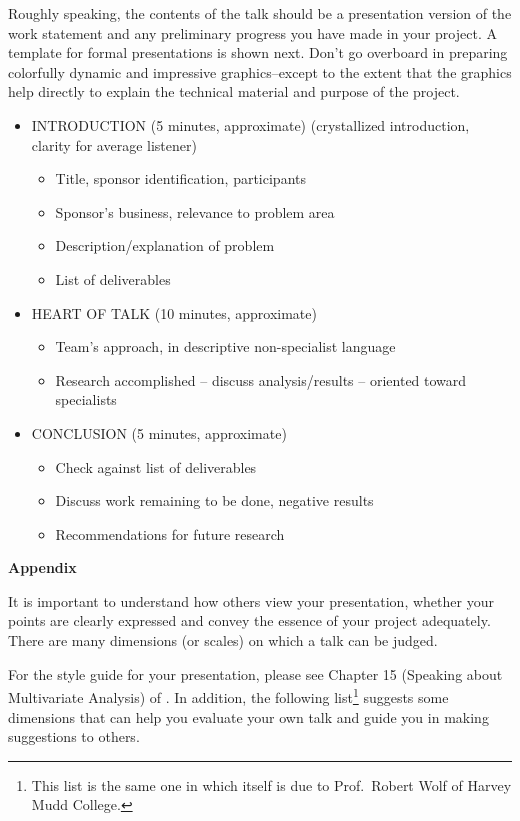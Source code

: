 \documentclass[12pt]{article}
\begin{document}
Roughly speaking, the contents of the talk should be a presentation
version of the work statement and any preliminary 
progress you have made in your project. A template for formal
presentations is shown next. Don't go overboard
in preparing colorfully dynamic and impressive graphics--except to the
extent that the graphics help directly to explain the technical
material and purpose of the project. 
\begin{itemize}
\item INTRODUCTION (5 minutes, approximate) (crystallized
  introduction, clarity for average listener)
\begin{itemize}
\item Title, sponsor identification, participants
\item Sponsor's business, relevance to problem area
\item Description/explanation of problem
\item List of deliverables
\end{itemize}
\item HEART OF TALK (10 minutes, approximate)
\begin{itemize}
\item Team's approach, in descriptive non-specialist language
\item Research accomplished -- discuss analysis/results -- oriented toward
specialists
\end{itemize}
\item CONCLUSION (5 minutes, approximate)
\begin{itemize}
\item Check against list of deliverables
\item Discuss work remaining to be done, negative results
\item Recommendations for future research
\end{itemize}
\end{itemize}



\begin{center}
{\bf Appendix}
\end{center}

It is important to understand how others view your presentation,
whether your points are clearly expressed and convey the essence of
your project adequately. There are many dimensions (or scales) on
which a talk can be judged. 

For the style guide for your presentation, please see 
Chapter 15 (Speaking about Multivariate Analysis) of \cite{WMA2005}.
In addition, the following list\footnote{This list
  is the same one in \cite{WMA2005} which itself is due to Prof.\  Robert Wolf of Harvey Mudd College.} suggests some dimensions that
can help you evaluate your own talk and guide you in making
suggestions to others.
\end{document}

